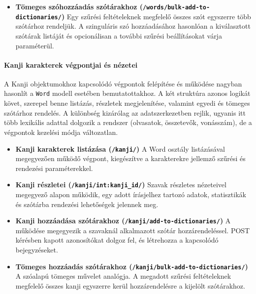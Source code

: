 \begin{itemize}
  \item \textbf{Tömeges szóhozzáadás szótárakhoz (\texttt{/words/bulk-add-to-dictionaries/})}\label{word-add-bulk}
  Egy szűrési feltételeknek megfelelő összes szót egyszerre több szótárhoz rendeljük. A szinguláris szó hozzáadásához hasonlóan a kiválasztott szótárak listáját és opcionálisan a további szűrési beállításokat várja paraméterül.

\end{itemize}

\paragraph{Kanji karakterek végpontjai és nézetei}

A Kanji objektumokhoz kapcsolódó végpontok felépítése és működése nagyban hasonlít a \texttt{Word} modell esetében bemutatottakhoz. A két struktúra azonos logikát követ, szerepel benne listázás, részletek megjelenítése, valamint egyedi és tömeges szótárhoz rendelés. A különbség kizárólag az adatszerkezetben rejlik, ugyanis itt több lexikális adattal dolgozik a rendszer (olvasatok, összetevők, vonásszám), de a végpontok kezelési módja változatlan.

\begin{itemize}
  \item \textbf{Kanji karakterek listázása (\texttt{/kanji/})}
  A Word osztály listázásával megegyezően működő végpont, kiegészítve a karakterekre jellemző szűrési és rendezési paraméterekkel.

  \item \textbf{Kanji részletei (\texttt{/kanji/int:kanji\_id/})}
  Szavak részletes nézeteivel megegyező alapon működik, egy adott írásjelhez tartozó adatok, statisztikák és szótárba rendezési lehetőségek jelennek meg.

  \item \textbf{Kanji hozzáadása szótárakhoz (\texttt{/kanji/add-to-dictionaries/})}
  A működése megegyezik a szavaknál alkalmazott szótár hozzárendeléssel. POST kérésben kapott azonosítókat dolgoz fel, és létrehozza a kapcsolódó bejegyzéseket.

  \item \textbf{Tömeges hozzáadás szótárakhoz (\texttt{/kanji/bulk-add-to-dictionaries/})}
  A szóalapú tömeges művelet analógja. A megadott szűrési feltételeknek megfelelő összes kanji egyszerre kerül hozzárendelésre a kijelölt szótárakhoz.
\end{itemize}
  
